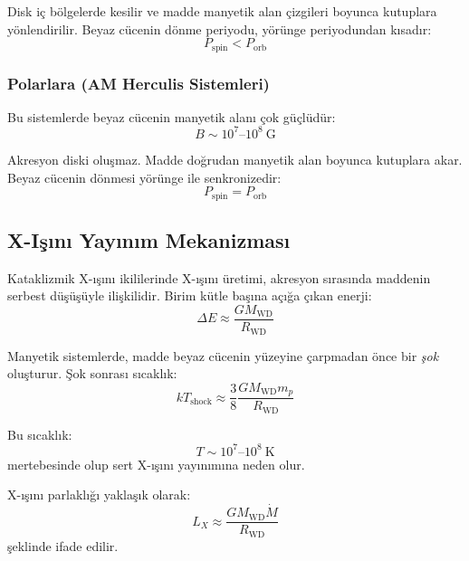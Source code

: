 Disk iç bölgelerde kesilir ve madde manyetik alan çizgileri boyunca kutuplara yönlendirilir. Beyaz cücenin dönme periyodu, yörünge periyodundan kısadır:
\begin{equation}
P_{\mathrm{spin}} < P_{\mathrm{orb}}
\end{equation}

\subsubsection{Polarlara (AM Herculis Sistemleri)}

Bu sistemlerde beyaz cücenin manyetik alanı çok güçlüdür:
\begin{equation}
B \sim 10^7\text{--}10^8\ \mathrm{G}
\end{equation}

Akresyon diski oluşmaz. Madde doğrudan manyetik alan boyunca kutuplara akar. Beyaz cücenin dönmesi yörünge ile senkronizedir:
\begin{equation}
P_{\mathrm{spin}} = P_{\mathrm{orb}}
\end{equation}

\subsection{X-Işını Yayınım Mekanizması}

Kataklizmik X-ışını ikililerinde X-ışını üretimi, akresyon sırasında maddenin serbest düşüşüyle ilişkilidir. Birim kütle başına açığa çıkan enerji:
\begin{equation}
\Delta E \approx \frac{GM_{\mathrm{WD}}}{R_{\mathrm{WD}}}
\end{equation}

Manyetik sistemlerde, madde beyaz cücenin yüzeyine çarpmadan önce bir \emph{şok} oluşturur. Şok sonrası sıcaklık:
\begin{equation}
kT_{\mathrm{shock}} \approx \frac{3}{8}\frac{GM_{\mathrm{WD}} m_p}{R_{\mathrm{WD}}}
\end{equation}

Bu sıcaklık:
\begin{equation}
T \sim 10^7\text{--}10^8\ \mathrm{K}
\end{equation}
mertebesinde olup sert X-ışını yayınımına neden olur.

X-ışını parlaklığı yaklaşık olarak:
\begin{equation}
L_X \approx \frac{GM_{\mathrm{WD}}\dot{M}}{R_{\mathrm{WD}}}
\end{equation}
şeklinde ifade edilir.

